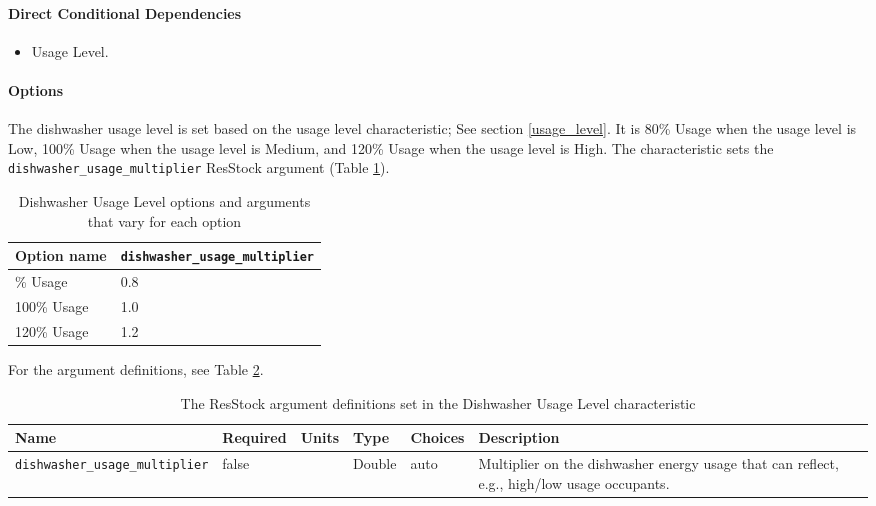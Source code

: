 \paragraph{Direct Conditional Dependencies}
\begin{itemize}
    \item Usage Level.
\end{itemize}

\paragraph{Options}
The dishwasher usage level is set based on the usage level characteristic; See section \ref{usage_level}. It is 80\% Usage when the usage level is Low, 100\% Usage when the usage level is Medium, and 120\% Usage when the usage level is High. The characteristic sets the \texttt{dishwasher\_usage\_multiplier} ResStock argument (Table \ref{table:hc_opt_dish_use}).

\begin{longtable}[]{ |p{3cm}|p{8cm}| }
\caption{Dishwasher Usage Level options and arguments that vary for each option} \label{table:hc_opt_dish_use} \\\toprule\noalign{}
Option name &
\texttt{dishwasher\_usage\_multiplier} \\
\midrule\noalign{}
\endhead
\bottomrule\noalign{}
\endlastfoot
80\% Usage & 0.8 \\
100\% Usage & 1.0 \\
120\% Usage & 1.2 \\
\end{longtable}

For the argument definitions, see Table \ref{table:hc_arg_def_dishwasher_usage_level}. 

\begin{longtable}[]{ |p{}|p{1.5cm}|p{1cm}|p{1.1cm}|p{3.4cm}|p{4cm}| }
\caption{The ResStock argument definitions set in the Dishwasher Usage Level characteristic} \label{table:hc_arg_def_dishwasher_usage_level}\\
\toprule\noalign{}
Name & Required & Units & Type & Choices & Description \\
\midrule\noalign{}
\endhead
\bottomrule\noalign{}
\endlastfoot
\texttt{dishwasher\_usage\_multiplier} & false & & Double & auto &
Multiplier on the dishwasher energy usage that can reflect, e.g.,
high/low usage occupants.  \\
\end{longtable}

